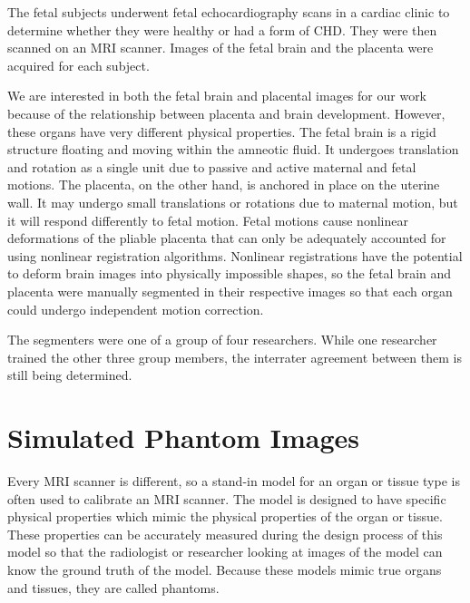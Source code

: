 The fetal subjects underwent fetal echocardiography scans in a cardiac clinic to determine whether they were healthy or had a form of CHD. They were then scanned on an MRI scanner. Images of the fetal brain and the placenta were acquired for each subject. 

We are interested in both the fetal brain and placental images for our work because of the relationship between placenta and brain development. However, these organs have very different physical properties. The fetal brain is a rigid structure floating and moving within the amneotic fluid. It undergoes translation and rotation as a single unit due to passive and active maternal and fetal motions. The placenta, on the other hand, is anchored in place on the uterine wall. It may undergo small translations or rotations due to maternal motion, but it will respond differently to fetal motion. Fetal motions cause nonlinear deformations of the pliable placenta that can only be adequately accounted for using nonlinear registration algorithms. Nonlinear registrations have the potential to deform brain images into physically impossible shapes, so the fetal brain and placenta were manually segmented in their respective images so that each organ could undergo independent motion correction. 

The segmenters were one of a group of four researchers. While one researcher trained the other three group members, the interrater agreement between them is still being determined.



\section{Simulated Phantom Images}

Every MRI scanner is different, so a stand-in model for an organ or tissue type is often used to calibrate an MRI scanner. The model is designed to have specific physical properties which mimic the physical properties of the organ or tissue. These properties can be accurately measured during the design process of this model so that the radiologist or researcher looking at images of the model can know the ground truth of the model. Because these models mimic true organs and tissues, they are called phantoms. 

